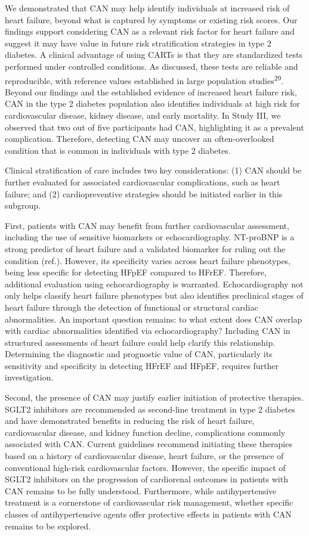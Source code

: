 \documentclass[
  a4paper,
  headsepline=true,
  open=any]{scrbook}
\begin{document}
We demonstrated that CAN may help identify individuals at increased risk
of heart failure, beyond what is captured by symptoms or existing risk
scores. Our findings support considering CAN as a relevant risk factor
for heart failure and suggest it may have value in future risk
stratification strategies in type 2 diabetes. A clinical advantage of
using CARTs is that they are standardized tests performed under
controlled conditions. As discussed, these tests are reliable and
reproducible, with reference values established in large population
studies\textsuperscript{29}. Beyond our findings and the established
evidence of increased heart failure risk, CAN in the type 2 diabetes
population also identifies individuals at high risk for cardiovascular
disease, kidney disease, and early mortality. In Study III, we observed
that two out of five participants had CAN, highlighting it as a
prevalent complication. Therefore, detecting CAN may uncover an
often-overlooked condition that is common in individuals with type 2
diabetes.

Clinical stratification of care includes two key considerations: (1) CAN
should be further evaluated for associated cardiovascular complications,
such as heart failure; and (2) cardiopreventive strategies should be
initiated earlier in this subgroup.

First, patients with CAN may benefit from further cardiovascular
assessment, including the use of sensitive biomarkers or
echocardiography. NT-proBNP is a strong predictor of heart failure and a
validated biomarker for ruling out the condition (ref.). However, its
specificity varies across heart failure phenotypes, being less specific
for detecting HFpEF compared to HFrEF. Therefore, additional evaluation
using echocardiography is warranted. Echocardiography not only helps
classify heart failure phenotypes but also identifies preclinical stages
of heart failure through the detection of functional or structural
cardiac abnormalities. An important question remains: to what extent
does CAN overlap with cardiac abnormalities identified via
echocardiography? Including CAN in structured assessments of heart
failure could help clarify this relationship. Determining the diagnostic
and prognostic value of CAN, particularly its sensitivity and
specificity in detecting HFrEF and HFpEF, requires further
investigation.

Second, the presence of CAN may justify earlier initiation of protective
therapies. SGLT2 inhibitors are recommended as second-line treatment in
type 2 diabetes and have demonstrated benefits in reducing the risk of
heart failure, cardiovascular disease, and kidney function decline,
complications commonly associated with CAN. Current guidelines recommend
initiating these therapies based on a history of cardiovascular disease,
heart failure, or the presence of conventional high-risk cardiovascular
factors. However, the specific impact of SGLT2 inhibitors on the
progression of cardiorenal outcomes in patients with CAN remains to be
fully understood. Furthermore, while antihypertensive treatment is a
cornerstone of cardiovascular risk management, whether specific classes
of antihypertensive agents offer protective effects in patients with CAN
remains to be explored.
\end{document}
